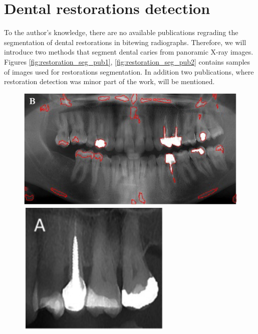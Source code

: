 \section{Dental restorations detection}
To the author's knowledge, there are no available publications regrading the segmentation of dental restorations in bitewing radiographs. Therefore, we will introduce two methods that segment dental caries from panoramic X-ray images. Figures \ref{fig:restoration_seg_pub1}, \ref{fig:restoration_seg_pub2} contains samples of images used for restorations segmentation.
In addition two publications, where restoration detection was minor part of the work, will be mentioned.
\begin{figure}
    \begin{floatrow}[2]
        {\includegraphics[width=\linewidth]{images/segmentation_opg.png}}\;
        {\includegraphics[width=\linewidth]{images/segmentation_crop.png}}
    \end{floatrow}
\end{figure}
